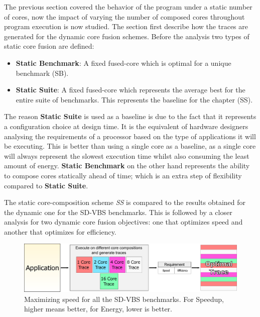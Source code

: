 The previous section covered the behavior of the program under a static number of cores, now the impact of varying the number of composed cores throughout program execution is now studied.
The section first describe how the traces are generated for the dynamic core fusion schemes.
Before the analysis two types of static core fusion are defined:

\begin{itemize}
	\item \textbf{Static Benchmark}: A fixed fused-core which is optimal for a unique benchmark (SB).
\vspace{-1.2em}
	\item \textbf{Static Suite}: A fixed fused-core which represents the average best for the entire suite of benchmarks. This represents the baseline for the chapter (SS).
\end{itemize}

The reason \textbf{Static Suite} is used as a baseline is due to the fact that it represents a configuration choice at design time.
It is the equivalent of hardware designers analysing the requirements of a processor based on the type of applications it will be executing.
This is better than using a single core as a baseline, as a single core will always represent the slowest execution time whilst also consuming the least amount of energy.
\textbf{Static Benchmark} on the other hand represents the ability to compose cores statically ahead of time; which is an extra step of flexibility compared to \textbf{Static Suite}.

The static core-composition scheme \textit{SS} is compared to the results obtained for the dynamic one for the SD-VBS benchmarks.
This is followed by a closer analysis for two dynamic core fusion objectives: one that optimizes speed and another that optimizes for efficiency.

\begin{figure}[t]
    \centering
	\includegraphics[width=1\textwidth]{cases-paper/graphics/exploration/trace-gathering.pdf}
    \caption{Maximizing speed for all the SD-VBS benchmarks. For Speedup, higher means better, for Energy, lower is better.}
    \label{fig:tracegraph}
	\vspace{1em}
\end{figure}

